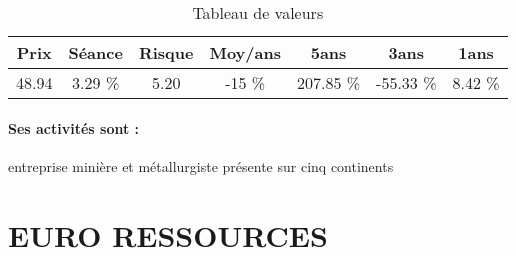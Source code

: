 \documentclass[11pt,a4paper]{report}%
\begin{document}
\begin{table}[H]
  \centering
    \begin{tabular}{|c|c|c|c|c|c|c|}
    \hline
    Prix & Séance & Risque  & Moy/ans & 5ans & 3ans & 1ans \\
    \hline
    48.94 &    3.29 \%    & 5.20 & -15 \% & 207.85 \% & -55.33 \% & 8.42 \% \\
    \hline
    \end{tabular}%
        \label{tab:table_ERAMET}%
      \caption{Tableau de valeurs}
\end{table}%

\paragraph{Ses activités sont : } entreprise minière et métallurgiste présente sur cinq continents 
    
    \newpage

\section{EURO RESSOURCES}
\end{document}
